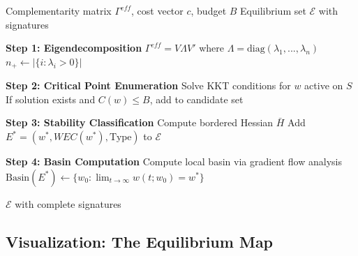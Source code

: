 \begin{algorithm}[H]
\caption{Equilibrium Landscape Mapping (MAP)}
\label{alg:landscape}
\begin{algorithmic}[1]
\Require Complementarity matrix $\Gamma^{eff}$, cost vector $c$, budget $B$
\Ensure Equilibrium set $\mathcal{E}$ with signatures

\State \textbf{Step 1: Eigendecomposition}
\State $\Gamma^{eff} = V \Lambda V'$ where $\Lambda = \text{diag}(\lambda_1, ..., \lambda_n)$
\State $n_+ \gets |\{i : \lambda_i > 0\}|$

\State \textbf{Step 2: Critical Point Enumeration}
    \State Solve KKT conditions for $w$ active on $S$
    \State If solution exists and $C(w) \leq B$, add to candidate set
\EndFor

\State \textbf{Step 3: Stability Classification}
    \State Compute bordered Hessian $\bar{H}$
        \State Add $E^* = (w^*, WEC(w^*), \text{Type})$ to $\mathcal{E}$
    \EndIf
\EndFor

\State \textbf{Step 4: Basin Computation}
    \State Compute local basin via gradient flow analysis
    \State $\text{Basin}(E^*) \gets \{w_0 : \lim_{t \to \infty} w(t; w_0) = w^*\}$
\EndFor

\Return $\mathcal{E}$ with complete signatures
\end{algorithmic}
\end{algorithm}

\subsection{Visualization: The Equilibrium Map}

